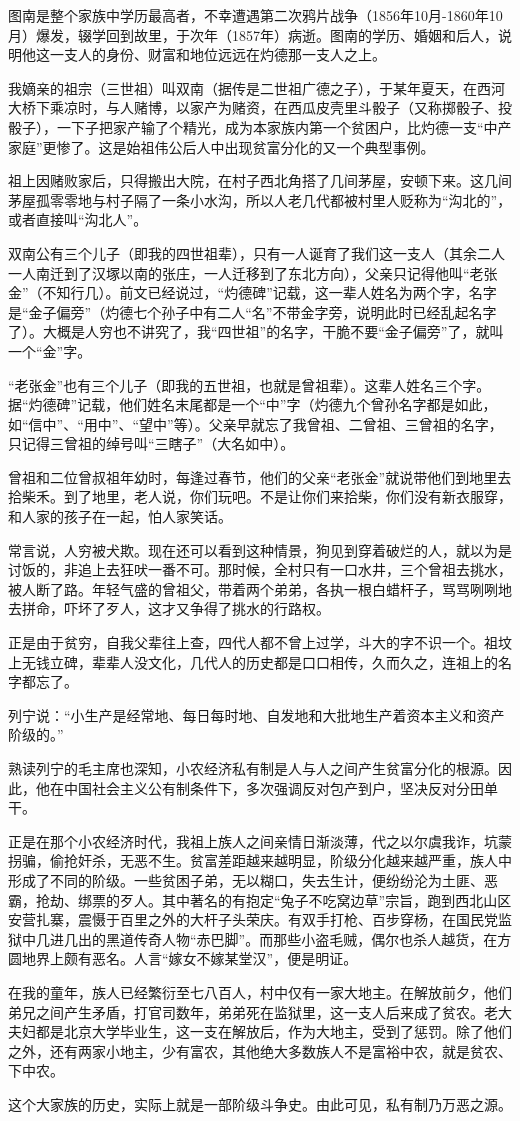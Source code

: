 \documentclass[../../dazhuan.tex]{subfiles}
\begin{document}
图南是整个家族中学历最高者，不幸遭遇第二次鸦片战争（1856年10月-1860年10月）爆发，辍学回到故里，于次年（1857年）病逝。图南的学历、婚姻和后人，说明他这一支人的身份、财富和地位远远在灼德那一支人之上。

我嫡亲的祖宗（三世祖）叫双南（据传是二世祖广德之子），于某年夏天，在西河大桥下乘凉时，与人赌博，以家产为赌资，在西瓜皮壳里斗骰子（又称掷骰子、投骰子），一下子把家产输了个精光，成为本家族内第一个贫困户，比灼德一支“中产家庭”更惨了。这是始祖伟公后人中出现贫富分化的又一个典型事例。

祖上因赌败家后，只得搬出大院，在村子西北角搭了几间茅屋，安顿下来。这几间茅屋孤零零地与村子隔了一条小水沟，所以人老几代都被村里人贬称为“沟北的”，或者直接叫“沟北人”。

双南公有三个儿子（即我的四世祖辈），只有一人诞育了我们这一支人（其余二人一人南迁到了汉塚以南的张庄，一人迁移到了东北方向），父亲只记得他叫“老张金”（不知行几）。前文已经说过，“灼德碑”记载，这一辈人姓名为两个字，名字是“金子偏旁”（灼德七个孙子中有二人“名”不带金字旁，说明此时已经乱起名字了）。大概是人穷也不讲究了，我“四世祖”的名字，干脆不要“金子偏旁”了，就叫一个“金”字。

“老张金”也有三个儿子（即我的五世祖，也就是曾祖辈）。这辈人姓名三个字。据“灼德碑”记载，他们姓名末尾都是一个“中”字（灼德九个曾孙名字都是如此，如“信中”、“用中”、“望中”等）。父亲早就忘了我曾祖、二曾祖、三曾祖的名字，只记得三曾祖的绰号叫“三瞎子”（大名如中）。

曾祖和二位曾叔祖年幼时，每逢过春节，他们的父亲“老张金”就说带他们到地里去拾柴禾。到了地里，老人说，你们玩吧。不是让你们来拾柴，你们没有新衣服穿，和人家的孩子在一起，怕人家笑话。

常言说，人穷被犬欺。现在还可以看到这种情景，狗见到穿着破烂的人，就以为是讨饭的，非追上去狂吠一番不可。那时候，全村只有一口水井，三个曾祖去挑水，被人断了路。年轻气盛的曾祖父，带着两个弟弟，各执一根白蜡杆子，骂骂咧咧地去拼命，吓坏了歹人，这才又争得了挑水的行路权。

正是由于贫穷，自我父辈往上查，四代人都不曾上过学，斗大的字不识一个。祖坟上无钱立碑，辈辈人没文化，几代人的历史都是口口相传，久而久之，连祖上的名字都忘了。

列宁说：“小生产是经常地、每日每时地、自发地和大批地生产着资本主义和资产阶级的。”

熟读列宁的毛主席也深知，小农经济私有制是人与人之间产生贫富分化的根源。因此，他在中国社会主义公有制条件下，多次强调反对包产到户，坚决反对分田单干。

正是在那个小农经济时代，我祖上族人之间亲情日渐淡薄，代之以尔虞我诈，坑蒙拐骗，偷抢奸杀，无恶不生。贫富差距越来越明显，阶级分化越来越严重，族人中形成了不同的阶级。一些贫困子弟，无以糊口，失去生计，便纷纷沦为土匪、恶霸，抢劫、绑票的歹人。其中著名的有抱定“兔子不吃窝边草”宗旨，跑到西北山区安营扎寨，震慑于百里之外的大杆子头荣庆。有双手打枪、百步穿杨，在国民党监狱中几进几出的黑道传奇人物“赤巴脚”。而那些小盗毛贼，偶尔也杀人越货，在方圆地界上颇有恶名。人言“嫁女不嫁某堂汉”，便是明证。

在我的童年，族人已经繁衍至七八百人，村中仅有一家大地主。在解放前夕，他们弟兄之间产生矛盾，打官司数年，弟弟死在监狱里，这一支人后来成了贫农。老大夫妇都是北京大学毕业生，这一支在解放后，作为大地主，受到了惩罚。除了他们之外，还有两家小地主，少有富农，其他绝大多数族人不是富裕中农，就是贫农、下中农。

这个大家族的历史，实际上就是一部阶级斗争史。由此可见，私有制乃万恶之源。
	
\end{document}
